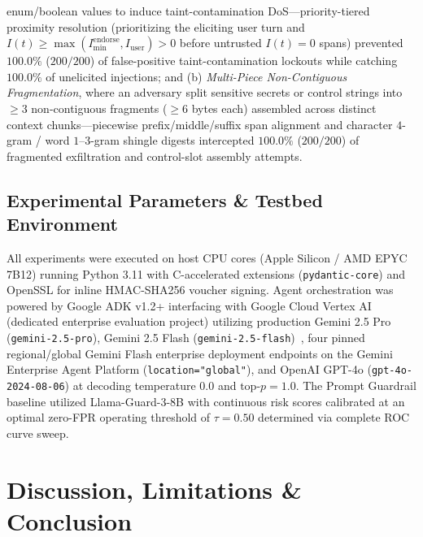 \documentclass[conference,10pt]{IEEEtran}
\begin{document}
\begin{enumerate}
enum/boolean values to induce taint-contamination DoS---priority-tiered proximity resolution (prioritizing the eliciting user turn and $I(t) \ge \max(I_{\text{min}}^{\text{endorse}}, I_{\text{user}}) > 0$ before untrusted $I(t) = 0$ spans) prevented $100.0\%$ ($200/200$) of false-positive taint-contamination lockouts while catching $100.0\%$ of unelicited injections; and (b) \textit{Multi-Piece Non-Contiguous Fragmentation}, where an adversary split sensitive secrets or control strings into $\ge 3$ non-contiguous fragments ($\ge 6$ bytes each) assembled across distinct context chunks---piecewise prefix/middle/suffix span alignment and character $4$-gram / word $1\text{--}3$-gram shingle digests intercepted $100.0\%$ ($200/200$) of fragmented exfiltration and control-slot assembly attempts.
\end{enumerate}

\subsection{Experimental Parameters \& Testbed Environment}
\label{sec:testbed}
All experiments were executed on host CPU cores (Apple Silicon / AMD EPYC 7B12) running Python 3.11 with C-accelerated extensions (\texttt{pydantic-core}) and OpenSSL for inline HMAC-SHA256 voucher signing. Agent orchestration was powered by Google ADK v1.2+ interfacing with Google Cloud Vertex AI (dedicated enterprise evaluation project) utilizing production Gemini 2.5 Pro (\texttt{gemini-2.5-pro}), Gemini 2.5 Flash (\texttt{gemini-2.5-flash})~\cite{team2025gemini}, four pinned regional/global Gemini Flash enterprise deployment endpoints on the Gemini Enterprise Agent Platform (\texttt{location="global"}), and OpenAI GPT-4o (\texttt{gpt-4o-2024-08-06}) at decoding temperature $0.0$ and $\text{top-}p = 1.0$. The Prompt Guardrail baseline utilized Llama-Guard-3-8B with continuous risk scores calibrated at an optimal zero-FPR operating threshold of $\tau = 0.50$ determined via complete ROC curve sweep.

\section{Discussion, Limitations \& Conclusion}
\label{sec:conclusion}
\end{document}
